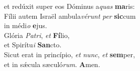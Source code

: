 \oddverse et redúxit super eos Dóminus a\textit{quas} \textbf{ma}ris:\\
\evenverse Fílii autem Israël ambula\textit{vé}\textit{runt} \textit{per} \textbf{sic}cum~\*\\
\evenverse in médi\textit{o} \textbf{e}jus.\\
\oddverse Glória \textit{Pa}\textit{tri}, \textit{et} \textbf{Fí}lio,~\*\\
\oddverse et Spirítu\textit{i} \textbf{San}cto.\\
\evenverse Sicut erat in princípio, \textit{et} \textit{nunc}, \textit{et} \textbf{sem}per,~\*\\
\evenverse et in sǽcula sæculó\textit{rum}. \textbf{A}men.\\
